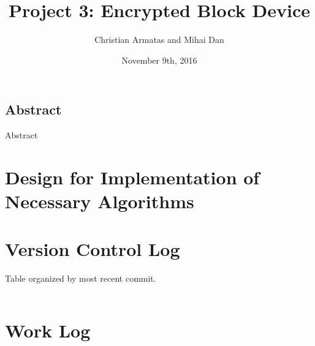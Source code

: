 \documentclass[letterpaper,10pt,onecolumn]{IEEEtran}
\title{Project 3: Encrypted Block Device}
\author{Christian Armatas and Mihai Dan}
\date{November 9th, 2016}
\begin{document}
    \begin{center}
        \begin{minipage}[h]{\textwidth}
            \maketitle
        \end{minipage}
    \end{center}
    
    \vspace{140mm}
    
    \begin{center}
        \section*{Abstract}
        Abstract
    \end{center}
    
    
    \newpage
    
    
    \section*{Design for Implementation of Necessary Algorithms}


    \vspace{6mm}
    
    
    \section*{Version Control Log}
        \begin{center}
            Table organized by most recent commit.
        \end{center}
        
        \vspace{1mm}
        
        \def\arraystretch{1.1}
        \begin{tabular}{ | p{16.75cm} | }
            \hline
            
            \hline
        \end{tabular}


    
    \vspace{6mm}
    
    
    \section*{Work Log}
    
\end{document}
